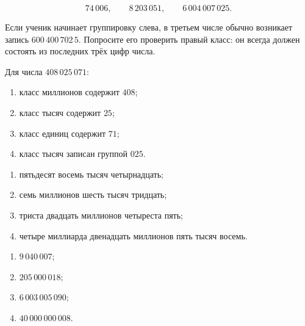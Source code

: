 
\clearpage
{}

\begin{teacheranswer}[Задание 1]
  \[
    74\,006,\qquad 8\,203\,051,\qquad 6\,004\,007\,025.
  \]
\end{teacheranswer}

\begin{criterionbox}
  Если ученик начинает группировку слева, в третьем числе обычно возникает
  запись \(600\,400\,702\,5\). Попросите его проверить правый класс: он
  всегда должен состоять из последних трёх цифр числа.
\end{criterionbox}

\begin{teacheranswer}[Задание 2]
  Для числа \(408\,025\,071\):
  \begin{enumerate}
    \item класс миллионов содержит \(408\);
    \item класс тысяч содержит \(25\);
    \item класс единиц содержит \(71\);
    \item класс тысяч записан группой \(025\).
  \end{enumerate}
\end{teacheranswer}

\begin{teacheranswer}[Задание 3]
  \begin{enumerate}
    \item пятьдесят восемь тысяч четырнадцать;
    \item семь миллионов шесть тысяч тридцать;
    \item триста двадцать миллионов четыреста пять;
    \item четыре миллиарда двенадцать миллионов пять тысяч восемь.
  \end{enumerate}
\end{teacheranswer}

\begin{teacheranswer}[Задание 4]
  \begin{enumerate}
    \item \(9\,040\,007\);
    \item \(205\,000\,018\);
    \item \(6\,003\,005\,090\);
    \item \(40\,000\,000\,008\).
  \end{enumerate}
\end{teacheranswer}


